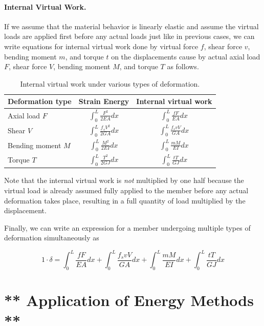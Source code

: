 \documentclass[
fontsize=10pt,
a4paper,
twosides=false,
open=any,
svgnames,
]{kaobook} %
\begin{document}
\paragraph{Internal Virtual Work.}

If we assume that the material behavior is linearly elastic and assume the virtual loads are applied first before any actual loads just like in previous cases, we can write equations for internal virtual work done by virtual force $f$, shear force $v$, bending moment $m$, and torque $t$ on the displacements cause by actual axial load $F$, shear force $V$, bending moment $M$, and torque $T$ as follows.

\begin{table}[h]
  \centering
  \caption{Internal virtual work under various types of deformation.}
  \begin{tabular}{l c c}
    \toprule
    Deformation type & Strain Energy & Internal virtual work \\
    \midrule
    Axial load $F$ & $\displaystyle \int_0^L \frac{F^2}{2EA} dx$ & $\displaystyle \int_0^L \frac{fF}{EA} dx $ \\[2em]
    Shear $V$ & $\displaystyle \int_0^L \frac{f_s V^2}{2GA} dx$ & $\displaystyle \int_0^L \frac{f_s vV}{GA} dx$ \\[2em]
    Bending moment $M$ & $\displaystyle \int_0^L \frac{M^2}{2EI} dx$ & $\displaystyle \int_0^L \frac{mM}{EI} dx$ \\[2em]
    Torque $T$ & $\displaystyle \int_0^L \frac{T^2}{2GJ} dx$ & $\displaystyle \int_0^L \frac{tT}{GJ} dx$ \\
    \bottomrule
  \end{tabular}
\end{table}

Note that the internal virtual work is \emph{not} multiplied by one half because the virtual load is already assumed fully applied to the member before any actual deformation takes place, resulting in a full quantity of load multiplied by the displacement.

Finally, we can write an expression for a member undergoing multiple types of deformation simultaneously as

\begin{equation}
  1 \cdot \delta = \int_0^L \frac{fF}{EA} dx + \int_0^L \frac{f_s vV}{GA} dx + \int_0^L \frac{mM}{EI} dx + \int_0^L \frac{tT}{GJ} dx
\end{equation}

\section{** Application of Energy Methods **}
\end{document}
